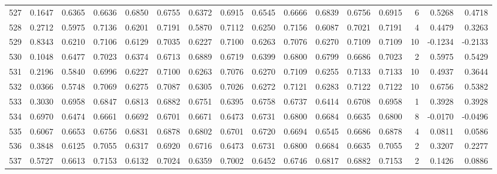 \begin{tabular}{lrrrrrrrrrrrrrrr}
527 &      0.1647 &  0.6365 &  0.6636 &  0.6850 &  0.6755 &  0.6372 &  0.6915 &  0.6545 &  0.6666 &  0.6839 &   0.6756 &     0.6915 &      6 &                    0.5268 &                     0.4718 \\
528 &      0.2712 &  0.5975 &  0.7136 &  0.6201 &  0.7191 &  0.5870 &  0.7112 &  0.6250 &  0.7156 &  0.6087 &   0.7021 &     0.7191 &      4 &                    0.4479 &                     0.3263 \\
529 &      0.8343 &  0.6210 &  0.7106 &  0.6129 &  0.7035 &  0.6227 &  0.7100 &  0.6263 &  0.7076 &  0.6270 &   0.7109 &     0.7109 &     10 &                   -0.1234 &                    -0.2133 \\
530 &      0.1048 &  0.6477 &  0.7023 &  0.6374 &  0.6713 &  0.6889 &  0.6719 &  0.6399 &  0.6800 &  0.6799 &   0.6686 &     0.7023 &      2 &                    0.5975 &                     0.5429 \\
531 &      0.2196 &  0.5840 &  0.6996 &  0.6227 &  0.7100 &  0.6263 &  0.7076 &  0.6270 &  0.7109 &  0.6255 &   0.7133 &     0.7133 &     10 &                    0.4937 &                     0.3644 \\
532 &      0.0366 &  0.5748 &  0.7069 &  0.6275 &  0.7087 &  0.6305 &  0.7026 &  0.6272 &  0.7121 &  0.6283 &   0.7122 &     0.7122 &     10 &                    0.6756 &                     0.5382 \\
533 &      0.3030 &  0.6958 &  0.6847 &  0.6813 &  0.6882 &  0.6751 &  0.6395 &  0.6758 &  0.6737 &  0.6414 &   0.6708 &     0.6958 &      1 &                    0.3928 &                     0.3928 \\
534 &      0.6970 &  0.6474 &  0.6661 &  0.6692 &  0.6701 &  0.6671 &  0.6473 &  0.6731 &  0.6800 &  0.6684 &   0.6635 &     0.6800 &      8 &                   -0.0170 &                    -0.0496 \\
535 &      0.6067 &  0.6653 &  0.6756 &  0.6831 &  0.6878 &  0.6802 &  0.6701 &  0.6720 &  0.6694 &  0.6545 &   0.6686 &     0.6878 &      4 &                    0.0811 &                     0.0586 \\
536 &      0.3848 &  0.6125 &  0.7055 &  0.6317 &  0.6920 &  0.6716 &  0.6473 &  0.6731 &  0.6800 &  0.6684 &   0.6635 &     0.7055 &      2 &                    0.3207 &                     0.2277 \\
537 &      0.5727 &  0.6613 &  0.7153 &  0.6132 &  0.7024 &  0.6359 &  0.7002 &  0.6452 &  0.6746 &  0.6817 &   0.6882 &     0.7153 &      2 &                    0.1426 &                     0.0886 \\

\end{tabular}
